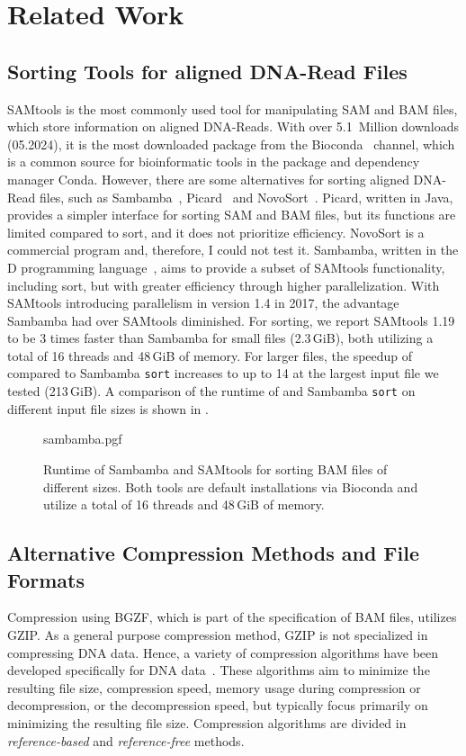 \section{Related Work}

\subsection{Sorting Tools for aligned DNA-Read Files}
SAMtools is the most commonly used tool for manipulating SAM and BAM files, which store information on aligned DNA-Reads. With over 5.1~Million downloads (05.2024), it is the most downloaded package from the Bioconda~\cite{the_bioconda_team_bioconda_2018} channel, which is a common source for bioinformatic tools in the package and dependency manager Conda. However, there are some alternatives for sorting aligned DNA-Read files, such as Sambamba~\cite{tarasov_sambamba_2015}, Picard~\cite{Picard2019toolkit} and NovoSort~\cite{noauthor_novosort_nodate}. Picard, written in Java, provides a simpler interface for sorting SAM and BAM files, but its functions are limited compared to sort, and it does not prioritize efficiency. NovoSort is a commercial program and, therefore, I could not test it. Sambamba, written in the D programming language~\cite{alexandrescu_d_2010}, aims to provide a subset of SAMtools functionality, including sort, but with greater efficiency through higher parallelization. With SAMtools introducing parallelism in version 1.4 in 2017, the advantage Sambamba had over SAMtools diminished. For sorting, we report SAMtools 1.19 to be 3 times faster than Sambamba for small files (2.3\,GiB), both utilizing a total of 16 threads and 48\,GiB of memory. For larger files, the speedup of \sort compared to Sambamba \texttt{sort} increases to up to 14 at the largest input file we tested (213\,GiB). A comparison of the runtime of \sort and Sambamba \texttt{sort} on different input file sizes is shown in .\\
\begin{figure}[t]
        {sambamba.pgf}
    \caption{Runtime of Sambamba and SAMtools for sorting BAM files of different sizes. Both tools are default installations via Bioconda and utilize a total of 16 threads and 48\,GiB of memory. }
    \label{fig:sambamba}
\end{figure}

\subsection{Alternative Compression Methods and File Formats}
Compression using BGZF, which is part of the specification of BAM files, utilizes GZIP. As a general purpose compression method, GZIP is not specialized in compressing DNA data. Hence, a variety of compression algorithms have been developed specifically for DNA data~\cite{hosseini_survey_2016}. These algorithms aim to minimize the resulting file size, compression speed, memory usage during compression or decompression, or the decompression speed, but typically focus primarily on minimizing the resulting file size. Compression algorithms are divided in \textit{reference-based} and \textit{reference-free} methods. \\

